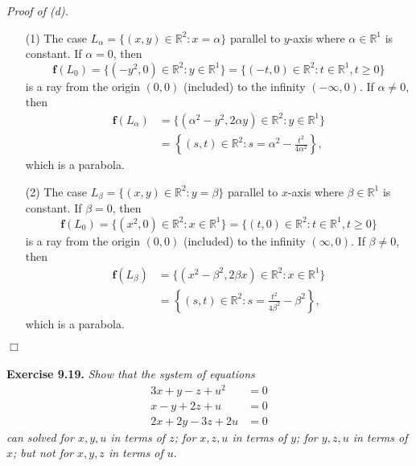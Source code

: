 \documentclass{article}
\begin{document}
\emph{Proof of (d).}
\begin{enumerate}
\item[(1)]
  The case $L_{\alpha} = \{ (x,y) \in \mathbb{R}^2 : x = \alpha \}$ parallel to $y$-axis
  where $\alpha \in \mathbb{R}^1$ is constant.
  If $\alpha = 0$, then
  \[
    \mathbf{f}(L_{0})
    = \{ (-y^2, 0) \in \mathbb{R}^2 : y \in \mathbb{R}^1 \}
    = \{ (-t, 0) \in \mathbb{R}^2 : t \in \mathbb{R}^1, t \geq 0 \}
  \]
  is a ray from the origin $(0,0)$ (included) to the infinity $(-\infty,0)$.
  If $\alpha \neq 0$, then
  \begin{align*}
    \mathbf{f}(L_{\alpha})
    &= \{ (\alpha^2 - y^2, 2\alpha y) \in \mathbb{R}^2 : y \in \mathbb{R}^1 \} \\
    &= \left\{ (s, t) \in \mathbb{R}^2 : s = \alpha^2 - \frac{t^2}{4\alpha^2} \right\},
  \end{align*}
  which is a parabola.

\item[(2)]
  The case $L_{\beta} = \{ (x,y) \in \mathbb{R}^2 : y = \beta \}$ parallel to $x$-axis
  where $\beta \in \mathbb{R}^1$ is constant.
  If $\beta = 0$, then
  \[
    \mathbf{f}(L_{0})
    = \{ (x^2, 0) \in \mathbb{R}^2 : x \in \mathbb{R}^1 \}
    = \{ (t, 0) \in \mathbb{R}^2 : t \in \mathbb{R}^1, t \geq 0 \}
  \]
  is a ray from the origin $(0,0)$ (included) to the infinity $(\infty,0)$.
  If $\beta \neq 0$, then
  \begin{align*}
    \mathbf{f}(L_{\beta})
    &= \{ (x^2 - \beta^2, 2\beta x) \in \mathbb{R}^2 : x \in \mathbb{R}^1 \} \\
    &= \left\{ (s, t) \in \mathbb{R}^2 : s = \frac{t^2}{4\beta^2} - \beta^2 \right\},
  \end{align*}
  which is a parabola.
\end{enumerate}
$\Box$ \\\\






\textbf{Exercise 9.19.}
\emph{Show that the system of equations
\begin{align*}
  3x+y-z+u^2 &= 0 \\
  x-y+2z+u &= 0 \\
  2x+2y-3z+2u &= 0
\end{align*}
can solved
for $x,y,u$ in terms of $z$;
for $x,z,u$ in terms of $y$;
for $y,z,u$ in terms of $x$;
but not for $x,y,z$ in terms of $u.$} \\
\end{document}
